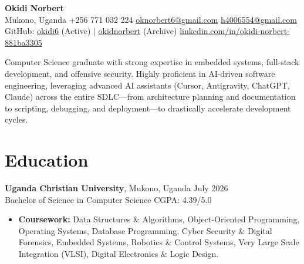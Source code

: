\documentclass[a4paper,10pt]{article}
\begin{document}
\begin{center}
    {\Huge \textbf{Okidi Norbert}} \\
    Mukono, Uganda \textbullet{} +256 771 032 224 \textbullet{} \href{mailto:oknorbert6@gmail.com}{oknorbert6@gmail.com} \textbullet{} \href{mailto:h4006554@gmail.com}{h4006554@gmail.com} \\
    GitHub: \href{https://github.com/okidi6}{okidi6} (Active) | \href{https://github.com/okidnorbert}{okidnorbert} (Archive) \textbullet{} \href{https://www.linkedin.com/in/okidi-norbert-881ba3305}{linkedin.com/in/okidi-norbert-881ba3305}
\end{center}

\vspace{-0.5em}

Computer Science graduate with strong expertise in embedded systems, full-stack development, and offensive security. Highly proficient in AI-driven software engineering, leveraging advanced AI assistants (Cursor, Antigravity, ChatGPT, Claude) across the entire SDLC—from architecture planning and documentation to scripting, debugging, and deployment—to drastically accelerate development cycles.

\section{Education}
\textbf{Uganda Christian University}, Mukono, Uganda \hfill July 2026 \\
Bachelor of Science in Computer Science \hfill CGPA: 4.39/5.0
\begin{itemize}[leftmargin=*]
    \item \textbf{Coursework:} Data Structures \& Algorithms, Object-Oriented Programming, Operating Systems, Database Programming, Cyber Security \& Digital Forensics, Embedded Systems, Robotics \& Control Systems, Very Large Scale Integration (VLSI), Digital Electronics \& Logic Design.
\end{itemize}
\end{document}
